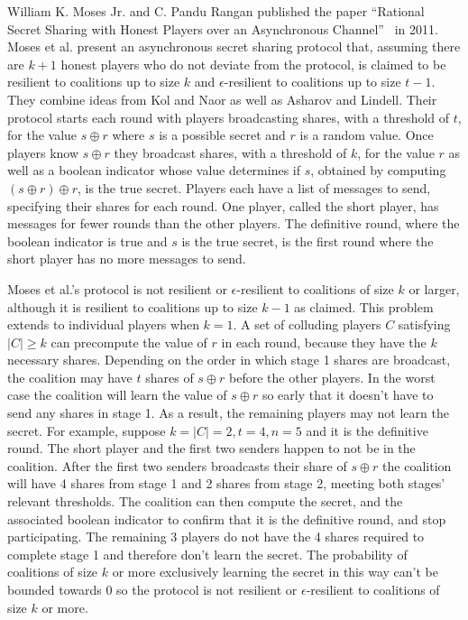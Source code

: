 \documentclass[12pt]{dalcsthesis}
\begin{document}
William K. Moses Jr. and C. Pandu Rangan published the paper ``Rational Secret Sharing with Honest Players over an Asynchronous Channel''~\cite{moses11} in 2011. Moses et al. present an asynchronous secret sharing protocol that, assuming there are $k+1$ honest players who do not deviate from the protocol, is claimed to be resilient to coalitions up to size $k$ and $\epsilon$-resilient to coalitions up to size $t-1$. They combine ideas from Kol and Naor as well as Asharov and Lindell. Their protocol starts each round with players broadcasting shares, with a threshold of $t$, for the value $s \oplus r$ where $s$ is a possible secret and $r$ is a random value. Once players know $s \oplus r$ they broadcast shares, with a threshold of $k$, for the value $r$ as well as a boolean indicator whose value determines if $s$, obtained by computing $(s \oplus r) \oplus r$, is the true secret. Players each have a list of messages to send, specifying their shares for each round. One player, called the short player, has messages for fewer rounds than the other players. The definitive round, where the boolean indicator is true and $s$ is the true secret, is the first round where the short player has no more messages to send.

Moses et al.'s protocol is not resilient or $\epsilon$-resilient to coalitions of size $k$ or larger, although it is resilient to coalitions up to size $k-1$ as claimed. This problem extends to individual players when $k=1$. A set of colluding players $C$ satisfying $|C| \geq k$ can precompute the value of $r$ in each round, because they have the $k$ necessary shares. Depending on the order in which stage 1 shares are broadcast, the coalition may have $t$ shares of $s \oplus r$ before the other players. In the worst case the coalition will learn the value of $s \oplus r$ so early that it doesn't have to send any shares in stage 1. As a result, the remaining players may not learn the secret. For example, suppose $k=|C|=2, t=4, n=5$ and it is the definitive round. The short player and the first two senders happen to not be in the coalition. After the first two senders broadcasts their share of $s \oplus r$ the coalition will have 4 shares from stage 1 and 2 shares from stage 2, meeting both stages' relevant thresholds. The coalition can then compute the secret, and the associated boolean indicator to confirm that it is the definitive round, and stop participating. The remaining 3 players do not have the 4 shares required to complete stage 1 and therefore don't learn the secret. The probability of coalitions of size $k$ or more exclusively learning the secret in this way can't be bounded towards 0 so the protocol is not resilient or $\epsilon$-resilient to coalitions of size $k$ or more.
\end{document}
